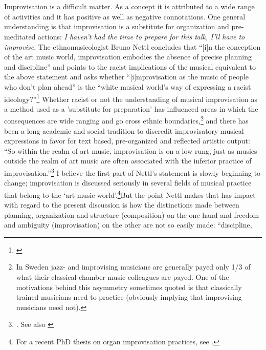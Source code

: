 
\section*{}
\label{sec:introduction}

Improvisation is a difficult matter. As a concept it is attributed to
a wide range of activities and it has positive as well as negative
connotations. One general understanding is that improvisation is a
substitute for organization and pre-meditated actions: \emph{I haven't
  had the time to prepare for this talk, I'll have to improvise}. The
ethnomusicologist Bruno Nettl concludes that ``[i]n the conception of
the art music world, improvisation embodies the absence of precise
planning and discipline'' and points to the racist implications of the
musical equivalent to the above statement and asks whether
``[i]mprovisation as the music of people who don't plan ahead'' is the
``white musical world's way of expressing a racist
ideology?''\footnote{\citet[p.7]{nettl98:2}} Whether racist or not the
understanding of musical improvisation as a method used as a
'substitute for preparation' has influenced areas in which the
consequences are wide ranging and go cross ethnic
boundaries,\footnote{In Sweden jazz- and improvising musicians are
  generally payed only 1/3 of what their classical chamber music
  colleagues are payed. One of the motivations behind this asymmetry
  sometimes quoted is that classically trained musicians need to
  practice (obviously implying that improvising musicians need not).}
and there has been a long academic and social tradition to discredit
improvisatory musical expressions in favor for text based,
pre-organized and reflected artistic output: ``So within the realm of
art music, improvisation is on a low rung, just as musics outside the
realm of art music are often associated with the inferior practice of
improvisation.''\footnote{\citet[p. 9]{nettl98:2}. See also
  \citet{lewis-1,bailey92}} I believe the first part of Nettl's
statement is slowly beginning to change; improvisation is discussed
seriously in several fields of musical practice that belong to the
`art music world'.\footnote{For a recent PhD thesis on organ
  improvisation practices, see \citet{johansson08}.}But the point
Nettl makes that has impact with regard to the present discussion is
how the distinctions made between planning, organization and structure
(composition) on the one hand and freedom and ambiguity
(improvisation) on the other are not so easily made: ``discipline,

